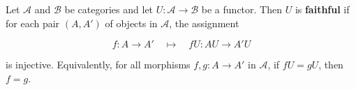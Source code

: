 Let $\mathcal{A}$ and $\mathcal{B}$ be categories and let $U: \mathcal{A} \to \mathcal{B}$ be a functor. Then $U$ is \textbf{faithful} if for each pair $(A, A')$ of objects in $\mathcal{A}$, the assignment

$$f: A \to A' \quad \longmapsto \quad fU: AU \to A'U$$

is injective. Equivalently, for all morphisms $f, g: A \to A'$ in $\mathcal{A}$, if $fU = gU$, then $f = g$.
